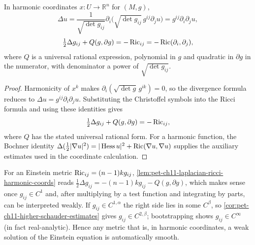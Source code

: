 \begin{lemma}
  \label{lem:pet-ch11-laplacian-ricci-harmonic-coords}

  In harmonic coordinates $x:U\to\mathbb{R}^n$ for $(M,g)$,
  \begin{equation}
    \Delta u=\frac1{\sqrt{\det g_{ij}}}\partial_i\big(\sqrt{\det g_{ij}}\,g^{ij}\partial_ju\big)=g^{ij}\partial_i\partial_ju,
  \end{equation}
  \begin{equation}
    \tfrac12\Delta g_{ij}+Q(g,\partial g)=-\operatorname{Ric}_{ij}=-\operatorname{Ric}(\partial_i,\partial_j),
  \end{equation}
  where $Q$ is a universal rational expression, polynomial in $g$ and
  quadratic in $\partial g$ in the numerator, with denominator a power of
  $\sqrt{\det g_{ij}}$.
\end{lemma}
\begin{proof}
  \sketch
  Harmonicity of \(x^k\) makes
  \(\partial_i(\sqrt{\det g}\,g^{ik})=0\), so the divergence formula reduces to
  \(\Delta u=g^{ij}\partial_i\partial_ju\). Substituting the Christoffel symbols into the Ricci formula and using these identities gives
  \[
    \tfrac12\Delta g_{ij}+Q(g,\partial g)=-\operatorname{Ric}_{ij},
  \]
  where \(Q\) has the stated universal rational form. For a harmonic function, the Bochner identity
  \(\Delta(\tfrac12|\nabla u|^2)=|\operatorname{Hess} u|^2+\operatorname{Ric}(\nabla u,\nabla u)\)
  supplies the auxiliary estimates used in the coordinate calculation.
\end{proof}


\begin{remark}
  \label{rem:pet-ch11-einstein-harmonic-regularity-bootstrap}

  For an Einstein metric $\operatorname{Ric}_{ij}=(n-1)kg_{ij}$,
  \cref{lem:pet-ch11-laplacian-ricci-harmonic-coords} reads
  $\tfrac12\Delta g_{ij}=-(n-1)kg_{ij}-Q(g,\partial g)$, which makes sense
  once $g_{ij}\in C^1$ and, after multiplying by a test function and
  integrating by parts, can be interpreted weakly. If $g_{ij}\in C^{1,\alpha}$
  the right side lies in some $C^\beta$, so \cref{cor:pet-ch11-higher-schauder-estimates}
  gives $g_{ij}\in C^{2,\beta}$; bootstrapping shows $g_{ij}\in C^\infty$
  (in fact real-analytic). Hence any metric that is, in harmonic coordinates,
  a weak solution of the Einstein equation is automatically smooth.
\end{remark}

